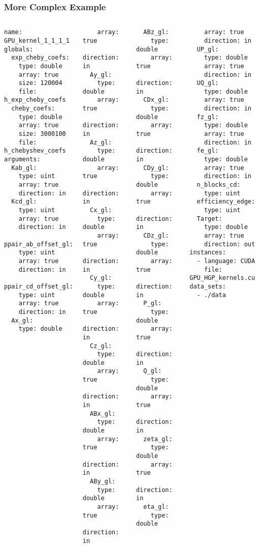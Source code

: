 \documentclass{beamer}
\begin{document}
\begin{frame}[fragile]
  \frametitle{More Complex Example}
  \vspace{-0.6em}
  \begin{columns}
  \begin{verbatim}
name: GPU_kernel_1_1_1_1
globals:
  exp_cheby_coefs:
    type: double
    array: true
    size: 120004
    file: h_exp_cheby_coefs
  cheby_coefs:
    type: double
    array: true
    size: 3000100
    file: h_chebyshev_coefs
arguments:
  Kab_gl:
    type: uint
    array: true
    direction: in
  Kcd_gl:
    type: uint
    array: true
    direction: in
  ppair_ab_offset_gl:
    type: uint
    array: true
    direction: in
  ppair_cd_offset_gl:
    type: uint
    array: true
    direction: in
  Ax_gl:
    type: double
  \end{verbatim}
  \begin{verbatim}
    array: true
    direction: in
  Ay_gl:
    type: double
    array: true
    direction: in
  Az_gl:
    type: double
    array: true
    direction: in
  Cx_gl:
    type: double
    array: true
    direction: in
  Cy_gl:
    type: double
    array: true
    direction: in
  Cz_gl:
    type: double
    array: true
    direction: in
  ABx_gl:
    type: double
    array: true
    direction: in
  ABy_gl:
    type: double
    array: true
    direction: in
  \end{verbatim}
  \begin{verbatim}
  ABz_gl:
    type: double
    array: true
    direction: in
  CDx_gl:
    type: double
    array: true
    direction: in
  CDy_gl:
    type: double
    array: true
    direction: in
  CDz_gl:
    type: double
    array: true
    direction: in
  P_gl:
    type: double
    array: true
    direction: in
  Q_gl:
    type: double
    array: true
    direction: in
  zeta_gl:
    type: double
    array: true
    direction: in
  eta_gl:
    type: double
  \end{verbatim}
  \begin{verbatim}
    array: true
    direction: in
  UP_gl:
    type: double
    array: true
    direction: in
  UQ_gl:
    type: double
    array: true
    direction: in
  fz_gl:
    type: double
    array: true
    direction: in
  fe_gl:
    type: double
    array: true
    direction: in
  n_blocks_cd:
    type: uint
  efficiency_edge:
    type: uint
  Target:
    type: double
    array: true
    direction: out
instances:
  - language: CUDA
    file: GPU_HGP_kernels.cu
data_sets:
  - ./data
  \end{verbatim}
  \end{columns}
\end{frame}
\end{document}
